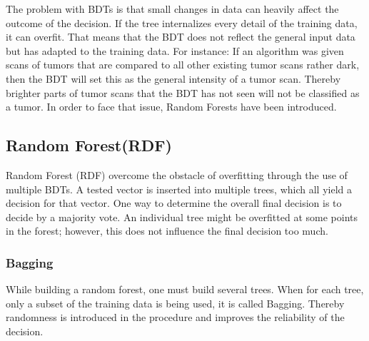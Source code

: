 \documentclass[
12pt,
headsepline,
bibliography=totoc,
twoside=semi,
fleqn
]{scrartcl}
\begin{document}
 The problem with BDTs is that small changes in data can heavily affect the outcome of the decision. If the tree internalizes every detail of the training data, it can overfit. That means that the BDT does not reflect the general input data but has adapted to the training data. For instance: If an algorithm was given scans of tumors that are compared to all other existing tumor scans rather dark, then the BDT will set this as the general intensity of a tumor scan. Thereby brighter parts of tumor scans that the BDT has not seen will not be classified as a tumor. In order to face that issue, Random Forests have been introduced. 

 \subsection{Random Forest(RDF)\label{sec:sec2-2}}
 Random Forest (RDF) overcome the obstacle of overfitting through the use of multiple BDTs. A tested vector is inserted into multiple trees, which all yield a decision for that vector. One way to determine the overall final decision is to decide by a majority vote. An individual tree might be overfitted at some points in the forest; however, this does not influence the final decision too much. 

 \subsubsection{Bagging\label{sec:sec2-2-1}}
 While building a random forest, one must build several trees. When for each tree, only a subset of the training data is being used, it is called Bagging. Thereby randomness is introduced in the procedure and improves the reliability of the decision. 
 
\end{document}

